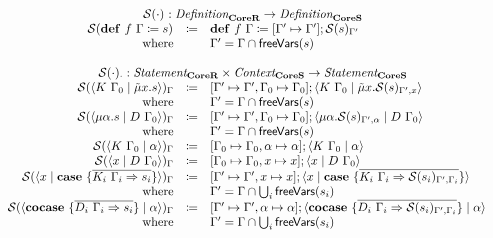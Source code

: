 \[
  \begin{array}{rcll}
    \multicolumn{4}{c}{\substruct{\cdot}{} : \emph{Definition}_{\targetred{}} \rightarrow \emph{Definition}_{\targetsub{}}}\\
    \substruct{\defi{f\ \Gamma}{s}}{} & \coloneq & \defi{f\ \Gamma}{\substitute{\Gamma' \mapsto \Gamma'}{\substruct{s}{\Gamma'}}} & \\
    \text{where} &  & \Gamma' = \Gamma \cap \free{s} & \\
    \\
    \multicolumn{4}{c}{\substruct{\cdot}{\cdot} : \emph{Statement}_{\targetred{}} \times \emph{Context}_{\targetsub{}} \rightarrow \emph{Statement}_{\targetsub{}}}\\
    \substruct{\cut{K\ \Gamma_0}{\tilde{\mu}x.s}}{\Gamma} & \coloneq & \substitute{\Gamma' \mapsto \Gamma', \Gamma_0 \mapsto \Gamma_0}{\cut{K\ \Gamma_0}{\tilde{\mu}x.\substruct{s}{\Gamma', x}}} & \\
    \text{where} &  & \Gamma' = \Gamma \cap \free{s} & \\
    \substruct{\cut{\mu\alpha.s}{D\ \Gamma_0}}{\Gamma} & \coloneq & \substitute{\Gamma' \mapsto \Gamma', \Gamma_0 \mapsto \Gamma_0}{\cut{\mu\alpha.\substruct{s}{\Gamma', \alpha}}{D\ \Gamma_0}} & \\
    \text{where} &  & \Gamma' = \Gamma \cap \free{s} & \\
    \substruct{\cut{K\ \Gamma_0}{\alpha}}{\Gamma} & \coloneq & \substitute{\Gamma_0 \mapsto \Gamma_0, \alpha \mapsto \alpha}{\cut{K\ \Gamma_0}{\alpha}} & \\
    \substruct{\cut{x}{D\ \Gamma_0}}{\Gamma} & \coloneq & \substitute{\Gamma_0 \mapsto \Gamma_0, x \mapsto x}{\cut{x}{D\ \Gamma_0}} & \\
    \substruct{\cut{x}{\case{\overline{K_i\ \Gamma_i \Rightarrow s_i}}}}{\Gamma} & \coloneq & \substitute{\Gamma' \mapsto \Gamma', x \mapsto x}{\cut{x}{\case{\overline{K_i\ \Gamma_i \Rightarrow \substruct{s_i}{\Gamma', \Gamma_i}}}}} & \\
    \text{where} &  & \Gamma' = \Gamma \cap \bigcup_i \free{s_i} & \\
    \substruct{\cut{\cocase{\overline{D_i\ \Gamma_i \Rightarrow s_i}}}{\alpha}}{\Gamma} & \coloneq & \substitute{\Gamma' \mapsto \Gamma', \alpha \mapsto \alpha}{\cut{\cocase{\overline{D_i\ \Gamma_i \Rightarrow \substruct{s_i}{\Gamma', \Gamma_i}}}}{\alpha}} & \\
    \text{where} &  & \Gamma' = \Gamma \cap \bigcup_i \free{s_i} & \\

\end{array}\]
